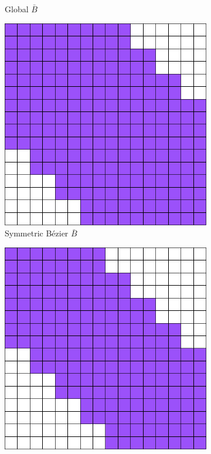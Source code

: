 \documentclass{article}
\begin{document}
\begin{figure}[!htb]
\begin{subfigure}[b]{0.24\linewidth}
        \caption{Global $\bar{B}$}
    \end{subfigure}
    \begin{subfigure}[b]{0.24\linewidth}        %
        \centering
        \includegraphics[width=\linewidth]{LB_extraction}
        \caption{Symmetric B\'ezier $\bar{B}$}
    \end{subfigure}
    \begin{subfigure}[b]{0.24\linewidth}        %
        \centering
        \includegraphics[width=\linewidth]{NS-LB_extraction}

\end{subfigure}
\end{figure}
\end{document}
